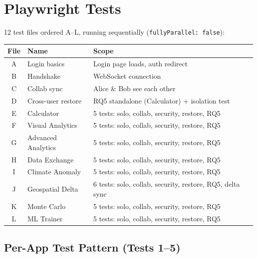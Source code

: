 \documentclass[12pt,a4paper]{article}
\begin{document}
\section{Playwright Tests}

12 test files ordered A--L, running sequentially (\texttt{fullyParallel: false}):

\begin{table}[h]
\centering
\small
\begin{tabular}{@{}cll@{}}
\toprule
\textbf{File} & \textbf{Name} & \textbf{Scope} \\
\midrule
A & Login basics            & Login page loads, auth redirect \\
B & Handshake               & WebSocket connection \\
C & Collab sync             & Alice \& Bob see each other \\
D & Cross-user restore      & RQ5 standalone (Calculator) + isolation test \\
E & Calculator              & 5 tests: solo, collab, security, restore, RQ5 \\
F & Visual Analytics        & 5 tests: solo, collab, security, restore, RQ5 \\
G & Advanced Analytics      & 5 tests: solo, collab, security, restore, RQ5 \\
H & Data Exchange           & 5 tests: solo, collab, security, restore, RQ5 \\
I & Climate Anomaly         & 5 tests: solo, collab, security, restore, RQ5 \\
J & Geospatial Delta        & 6 tests: solo, collab, security, restore, RQ5, delta sync \\
K & Monte Carlo             & 5 tests: solo, collab, security, restore, RQ5 \\
L & ML Trainer              & 5 tests: solo, collab, security, restore, RQ5 \\
\bottomrule
\end{tabular}
\end{table}

\subsection{Per-App Test Pattern (Tests 1--5)}
\end{document}
